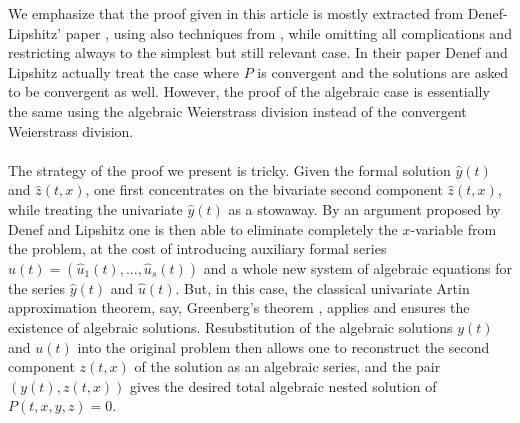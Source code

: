 \documentclass[10pt, a4paper]{article}
\def\wh{\widehat}
\theoremstyle{remark}
\theoremstyle{remark}
\begin{document}
  We emphasize that the proof given in this article is mostly extracted from Denef-Lipshitz' paper \cite{Denef1980}, using also techniques from \cite{Hauser_Woblistin_2021}, while omitting all complications and restricting always to the simplest but still relevant case. In their paper Denef and Lipshitz actually treat the case where $P$ is convergent and the solutions are asked to be convergent as well. However, the proof of the algebraic case is essentially the same using the algebraic Weierstrass division instead of the convergent Weierstrass division.\\ 
  \\The strategy of the proof we present is tricky. Given the formal solution $\wh{y}(t)$ and $\wh{z}(t,x)$, one first concentrates on the bivariate second component $\wh{z}(t,x)$, while treating the univariate $\wh{y}(t)$ as a stowaway. By an argument proposed by Denef and Lipshitz one is then able to eliminate completely the $x$-variable from the problem, at the cost of introducing auxiliary formal series $\wh{u}(t)=(\wh{u}_1(t),...,\wh{u}_s(t))$ and a whole new system of algebraic equations for the series $\wh{y}(t)$ and $\wh{u}(t)$. But, in this case, the classical univariate Artin approximation theorem, say, Greenberg's theorem \cite{Greenberg1966}, applies and ensures the existence of algebraic solutions. Resubstitution of the algebraic solutions $y(t)$ and $u(t)$ into the original problem then allows one to reconstruct the second component $z(t,x)$ of the solution as an algebraic series, and the pair $(y(t), z(t,x))$ gives the desired total algebraic nested solution of $P(t,x,y,z) = 0$.\\
       
\end{document}
